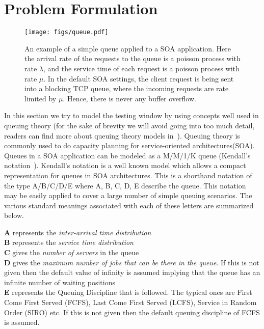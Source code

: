 \section{Problem Formulation}
\label{sec:model}


\begin{figure}[h]
	\begin{center}
		\texttt{[image: figs/queue.pdf]}
		\caption{An example of a simple queue applied to a SOA application. Here the arrival rate of the requests to the queue is a poisson process with rate $\lambda$, and the service time of each request is a poisson process with rate $\mu$. In the default SOA settings, the client request is being sent into a blocking TCP queue, where the incoming requests are rate limited by $\mu$. Hence, there is never any buffer overflow.}
		\label{fig:queueModel}
	\end{center}
\end{figure}

In this section we try to model the testing window by using concepts well used in queuing theory (for the sake of brevity we will avoid going into too much detail, readers can find more about queuing theory models in~\cite{Gross:1985:FQT:6778}).
Queuing theory is commonly used to do capacity planning for service-oriented architectures(SOA).
Queues in a SOA application can be modeled as a M/M/1/K queue (Kendall's notation~\cite{kendall1953}).
Kendall's notation is a well known model which allows a compact representation for queues in SOA architectures.
This is a shorthand notation of the type A/B/C/D/E where A, B, C, D, E describe the queue.
This notation may be easily applied to cover a large number of simple queuing scenarios.
The various standard meanings associated with each of these letters are summarized below.\\

\begin{framed}
	\noindent \textbf{A} represents the \emph{inter-arrival time distribution}\\
	\textbf{B} represents the \emph{service time distribution}\\
	\textbf{C} gives the \emph{number of servers} in the queue\\
	\textbf{D} gives the \emph{maximum number of jobs that can be there in the queue}.
	If this is not given then the default value of infinity \infinity is assumed implying that the queue has an infinite number of waiting positions\\
	\textbf{E} represents the Queuing Discipline that is followed. The typical ones are First Come First Served (FCFS), Last Come First Served (LCFS), Service in Random Order (SIRO) etc. If this is not given then the default queuing discipline of FCFS is assumed.
\end{framed}

